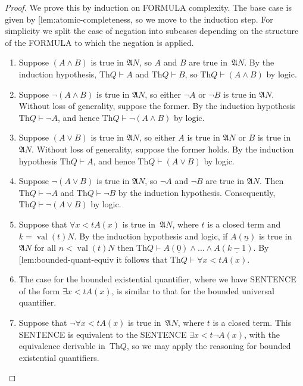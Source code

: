 \documentclass[10pt,a4paper]{article}
\makeatletter
\newcommand*{\olup}[1]{\MakeUppercase{#1}}
\theoremstyle{plain}
\theoremstyle{definition}
\theoremstyle{remark}
\newcommand{\olref}{\@ifnextchar[{\olref@i}{\olref@final}}
\def\olref@i[#1]{\@ifnextchar[{\olref@ii}{\olref@final}}
\def\olref@ii[#1]{\@ifnextchar[{\olref@iii}{\olref@final}}
\def\olref@iii[#1]{\olref@final}
\def\olref@final#1{\ref{#1}}
\providecommand{\Proves}{\mathrel{\vdash}}
\providecommand{\Struct}{\ensuremath{\mathfrak{A}}}
\providecommand{\Th}{\ensuremath{\mathrm{Th}}}
\providecommand{\num}[1]{\underline{#1}}
\providecommand{\Value}[1]{\operatorname{val}(#1)}
\providecommand{\bforall}{\forall}
\providecommand{\bexists}{\exists}
\makeatother
\begin{document}
\begin{proof}
We prove this by induction on \olup{formula} complexity.
%
The base case is given by \olref{lem:atomic-completeness},
so we move to the induction step. For simplicity we split
the case of negation into subcases depending on the
structure of the \olup{formula} to which the negation is
applied.

\begin{enumerate}
\item Suppose $(A \land B)$ is true in $\Struct{N}$,
so $A$ and $B$ are true in~$\Struct{N}$.
By the induction hypothesis, $\Th{Q} \Proves A$ and
$\Th{Q} \Proves B$,
so $\Th{Q} \Proves (A \land B)$ by logic.
%
\item Suppose $\lnot (A \land B)$ is true in $\Struct{N}$,
so either $\lnot A$ or $\lnot B$ is true in $\Struct{N}$.
Without loss of generality, suppose the former. By the
induction hypothesis $\Th{Q} \Proves \lnot A$, and hence
$\Th{Q} \Proves \lnot (A \land B)$ by logic.
%
\item Suppose $(A \lor B)$ is true in $\Struct{N}$, so
either $A$ is true in $\Struct{N}$ or $B$ is true in
$\Struct{N}$. Without loss of generality, suppose the former
holds. By the induction hypothesis $\Th{Q} \Proves A$, and
hence $\Th{Q} \Proves (A \lor B)$ by logic.
%
\item Suppose $\lnot(A \lor B)$ is true in $\Struct{N}$,
so $\lnot A$ and $\lnot B$ are true in $\Struct{N}$.
Then $\Th{Q} \Proves \lnot A$ and $\Th{Q} \Proves \lnot B$
by the induction hypothesis. Consequently,
$\Th{Q} \Proves \lnot(A \lor B)$ by logic.
%
\item Suppose that $\bforall{x<t}{A(x)}$ is true 
in~$\Struct{N}$, where $t$ is a closed term and $k=\Value{t}{N}$. By the induction
hypothesis and logic, if $A(\num n)$ is true in~$\Struct{N}$
for all $n < \Value{t}{N}$ then $\Th{Q} \Proves
A(\num 0) \land \dots \land A(\num{k-1})$.
By \olref{lem:bounded-quant-equiv} it follows that
$\Th{Q} \Proves \bforall{x<t}{A(x)}$.
%
\item The case for the bounded existential quantifier, where
we have \olup{sentence} of the form $\bexists{x < t}{A(x)}$,
is similar to that for the bounded universal quantifier.
%
\item Suppose that $\lnot \bforall{x<t}{A(x)}$ is true 
in~$\Struct{N}$, where $t$ is a closed term. This \olup{sentence}
is equivalent to the \olup{sentence} $\bexists{x<t}{\lnot A(x)}$,
with the equivalence derivable in~$\Th{Q}$, so we may apply
the reasoning for bounded existential quantifiers.

\end{enumerate}
\end{proof}
\end{document}
